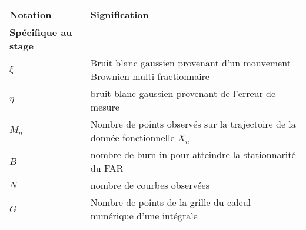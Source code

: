 \begin{table}[H]
	\centering
	\begin{tabularx}{\textwidth}{lX}
		\toprule
		\textbf{Notation} & \textbf{Signification}                                                                                                                                                                                                                                  \\
		\midrule
		\textbf{Spécifique au stage}                                                                                                                                                                                                                                                \\
		\midrule
		$\xi$             & Bruit blanc gaussien provenant d'un mouvement Brownien multi-fractionnaire                                                                                                                                                                              \\
		$\eta$            & bruit blanc gaussien provenant de l'erreur de mesure                                                                                                                                                                                                    \\
		\midrule
		$M_n$             & Nombre de points observés sur la trajectoire de la donnée fonctionnelle $X_n$                                                                                                                                                                           \\
		$B$               & nombre de burn-in pour atteindre la stationnarité du FAR                                                                                                                                                                                                \\
		$N$               & nombre de courbes observées                                                                                                                                                                                                                             \\
		$G$               & Nombre de points de la grille du calcul numérique d'une intégrale                                                                                                                                                                                       \\

\end{tabularx}
\end{table}
